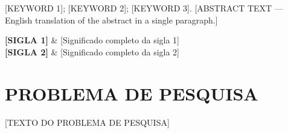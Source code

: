 \documentclass[12pt,a4paper,oneside]{article}
\newcommand{\GerarListasESumario}{%
  \ifMostrarListaFiguras
    \thispagestyle{empty}
    \listoffigures
    \thispagestyle{empty}
    \clearpage
  \fi
  \ifMostrarListaQuadros
    \thispagestyle{empty}
    \listofquadro
    \thispagestyle{empty}
    \clearpage
  \fi
  \ifMostrarListaTabelas
    \thispagestyle{empty}
    \listoftables
    \thispagestyle{empty}
    \clearpage
  \fi
  \ifMostrarSumario
    \thispagestyle{empty}
    \tableofcontents
    \thispagestyle{empty}
    \clearpage
  \fi
  \pagestyle{fancy}%
  \ifReiniciarPaginaNoCorpo
    \setcounter{page}{1}%
  \fi
}
\newcommand{\Sigla}[2]{\textbf{#1} & #2 \\[4pt]}
\newcommand{\Secao}[1]{%
  \ifSecoesEmNovaPagina\clearpage\fi
  \section{#1}%
}
\newcommand{\Subsecao}[1]{\subsection{#1}}
\newcommand{\Subsubsecao}[1]{\subsubsection{#1}}
\begin{document}
\begin{BlocoAbstract}{[KEYWORD 1]; [KEYWORD 2]; [KEYWORD 3].}
[ABSTRACT TEXT — English translation of the abstract in a single paragraph.]
\end{BlocoAbstract}

\begin{BlocoSiglas}
  \Sigla{[SIGLA 1]}{[Significado completo da sigla 1]}
  \Sigla{[SIGLA 2]}{[Significado completo da sigla 2]}
\end{BlocoSiglas}

\GerarListasESumario




\Secao{PROBLEMA DE PESQUISA}

[TEXTO DO PROBLEMA DE PESQUISA]

\end{document}
